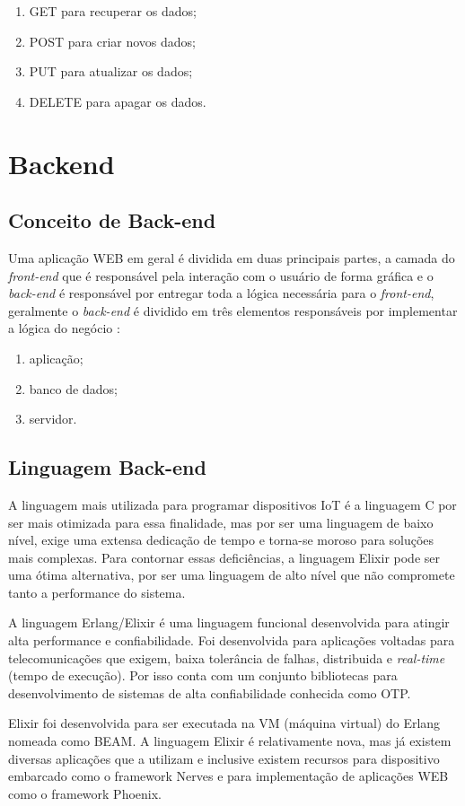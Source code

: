 \documentclass[../../layout.tex]{subfiles}
\begin{document}
\begin{enumerate}[label=\alph*)]
\itemsep0em
    \item GET para recuperar os dados;
    \item POST para criar novos dados;
    \item PUT para atualizar os dados;
    \item DELETE para apagar os dados.
\end{enumerate}

\section{Backend}
\subsection{Conceito de Back-end}
\hspace*{3em}Uma aplicação WEB em geral é dividida  em duas principais partes, a camada do \emph{front-end} que é responsável pela interação com o usuário de forma gráfica e o \emph{back-end} é responsável por entregar toda a lógica necessária para o \emph{front-end}, geralmente o \emph{back-end} é dividido em três elementos responsáveis por implementar a lógica do negócio \cite{16}:

\begin{enumerate}[label=\alph*)]
\itemsep0em
    \item aplicação;
    \item banco de dados;
    \item servidor.
\end{enumerate}

\subsection{Linguagem Back-end}
\hspace*{3em}A linguagem mais utilizada para programar dispositivos IoT é a linguagem C por ser mais otimizada para essa finalidade, mas por ser uma linguagem de baixo nível, exige uma extensa dedicação de tempo e torna-se moroso para soluções mais complexas. Para contornar essas deficiências, a linguagem Elixir pode ser uma ótima alternativa, por ser uma linguagem de alto nível que não compromete tanto a performance do sistema.\par
A linguagem Erlang/Elixir é uma linguagem funcional desenvolvida para atingir alta performance e confiabilidade. Foi desenvolvida para aplicações voltadas para telecomunicações que exigem, baixa tolerância de falhas, distribuida e \emph{real-time} (tempo de execução). Por isso conta com um conjunto bibliotecas para desenvolvimento de sistemas de alta confiabilidade conhecida como OTP.\par
Elixir foi desenvolvida para ser executada na VM (máquina virtual) do Erlang nomeada como BEAM. A linguagem Elixir é relativamente nova, mas já existem diversas aplicações que a utilizam e inclusive existem recursos para dispositivo embarcado como o framework Nerves \cite{ElixirorIoT} e para implementação de aplicações WEB como o framework Phoenix.
\end{document}
